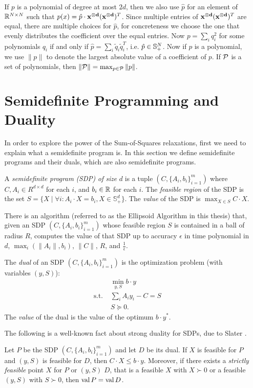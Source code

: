 If $p$ is a polynomial of degree at most $2d$, then we also use $\hat{p}$ for an element of $\mathbb R^{N \times N}$ such that $p(x) = \hat{p} \cdot \mathbf{x^{\otimes d}}(\mathbf{x^{\otimes d}})^T$. Since multiple entries of $\mathbf{x^{\otimes d}}(\mathbf{x^{\otimes d}})^T$ are equal, there are multiple choices for $\hat{p}$, for concreteness we choose the one that evenly distributes the coefficient over the equal entries. Now $p = \sum_i q_i^2$ for some polynomials $q_i$ if and only if $\hat{p} = \sum_i \tilde{q}_i\tilde{q}_i^T$, i.e. $\hat{p} \in \mathbb{S}^{N}_+$. Now if $p$ is a polynomial, we use $\|p\|$ to denote the largest absolute value of a coefficient of $p$. If $\mathcal P$ is a set of polynomials, then $\|\mathcal P\| = \max_{p \in \mathcal P} \|p\|$.

\section{Semidefinite Programming and Duality}
In order to explore the power of the Sum-of-Squares relaxations, first we need to explain what a semidefinite program is.
In this section we define semidefinite programs and their duals, which are also semidefinite programs.

\begin{definition}
A \emph{semidefinite program (SDP) of size $d$} is a tuple $(C,\{A_i, b_i\}_{i=1}^m)$ where $C,A_i \in R^{d \times d}$ for each $i$, and $b_i \in \mathbb R$ for each $i$.
The \emph{feasible region} of the SDP is the set $S = \{X \mid \forall i: A_i \cdot X = b_i, X \in \mathbb{S}_+^d\}$.
The \emph{value} of the SDP is $\max_{X\in S} C \cdot X$.
\end{definition}
\begin{fact}
There is an algorithm (referred to as the Ellipsoid Algorithm in this thesis) that, given an SDP $(C, \{A_i,b_i\}_{i=1}^m)$ whose feasible region $S$ is contained in a ball of radius $R$, computes the value of that SDP up to accuracy $\epsilon$ in time polynomial in $d$, $\max_i\left(\|A_i\|,b_i\right)$, $\|C\|$, $R$, and $\frac{1}{\epsilon}$.
\end{fact}

\begin{definition}
The \emph{dual} of an SDP $(C, \{A_i, b_i\}_{i=1}^m)$ is the optimization problem (with variables $(y,S)$):
\begin{align*}
&\min_{y,S} b \cdot y \\
\text{s.t. }&\sum_i A_i y_i - C = S \\
&S \succeq 0.
\end{align*}
The \emph{value} of the dual is the value of the optimum $b \cdot y^*$.
\end{definition}
The following is a well-known fact about strong duality for SDPs, due to Slater \cite{Slater2014}.
\begin{lemma}\label{lem:duality}
Let $P$ be the SDP $(C, \{A_i, b_i\}_{i=1}^m)$ and let $D$ be its dual. If $X$ is feasible for $P$ and $(y,S)$ is feasible for $D$, then $C \cdot X \leq b \cdot y$. Moreover, if there exists a \emph{strictly feasible} point $X$ for $P$ or $(y,S)$ $D$, that is a feasible $X$ with $X \succ 0$ or a feasible $(y,S)$ with $S \succ 0$, then $\operatorname{val}{P} = \operatorname{val}{D}$.
\end{lemma}

